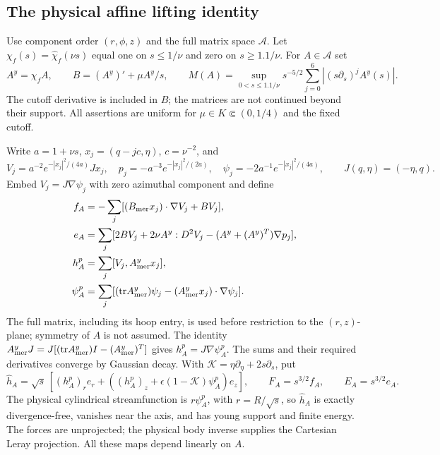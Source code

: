\subsection{The physical affine lifting identity}

Use component order $(r,\phi,z)$ and the full matrix space $\mathscr A$.
Let $\chi_f(s)=\widehat\chi_f(\nu s)$ equal one on $s\le1/\nu$
and zero on $s\ge1.1/\nu$. For $A\in\mathscr A$ set
\[
 A^y=\chi_f A,\qquad B=(A^y)'+\mu A^y/s,\qquad
 M(A)=\sup_{0<s\le1.1/\nu}s^{-5/2}
                \sum_{j=0}^6|(s\partial_s)^jA^y(s)|.
\]
The cutoff derivative is included in $B$; the matrices are not
continued beyond their support. All assertions are uniform for
$\mu\in K\Subset(0,1/4)$ and the fixed cutoff.

Write $a=1+\nu s$, $x_j=(q-jc,\eta)$, $c=\nu^{-2}$, and
\[
 V_j=a^{-2}e^{-|x_j|^2/(4a)}Jx_j,\quad
 p_j=-a^{-3}e^{-|x_j|^2/(2a)},\quad
 \psi_j=-2a^{-1}e^{-|x_j|^2/(4a)},\qquad J(q,\eta)=(-\eta,q).
\]
Embed $V_j=J\nabla\psi_j$ with zero azimuthal component and define
\[
 \begin{split}
 f_A&=-\sum_j[(B_{\rm mer}x_j)\cdot\nabla V_j+BV_j],\\
 e_A&=\sum_j[2BV_j+2\nu A^y:D^2V_j
                         -(A^y+(A^y)^T)\nabla p_j],\\
 h_A^p&=\sum_j[V_j,A^y_{\rm mer}x_j],\\
 \psi_A^p&=\sum_j[({\rm tr}A^y_{\rm mer})\psi_j
                     -(A^y_{\rm mer}x_j)\cdot\nabla\psi_j].
 \end{split}
\]
The full matrix, including its hoop entry, is used before restriction
to the $(r,z)$-plane; symmetry of $A$ is not assumed. The identity
$A^y_{\rm mer}J=J[({\rm tr}A^y_{\rm mer})I-(A^y_{\rm mer})^T]$
gives $h_A^p=J\nabla\psi_A^p$.
The sums and their required derivatives converge by Gaussian decay.
With $\mathcal K=\eta\partial_\eta+2s\partial_s$, put
\[
 \widehat h_A=\sqrt s\,[(h_A^p)_r e_r+
       ((h_A^p)_z+\epsilon(1-\mathcal K)\psi_A^p)e_z],
 \qquad F_A=s^{3/2}f_A,\qquad E_A=s^{3/2}e_A.
\]
The physical cylindrical streamfunction is $r\psi_A^p$, with
$r=R/\sqrt s$, so $\widehat h_A$ is exactly divergence-free, vanishes
near the axis, and has young support and finite energy. The forces
are unprojected; the physical body inverse supplies the Cartesian
Leray projection. All these maps depend linearly on $A$.

